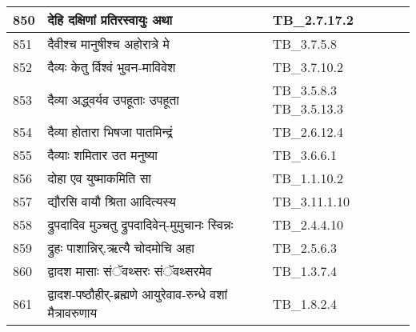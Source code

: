 \documentclass[17pt]{extarticle}
\begin{document}
\begin{longtable}{||p{0.4in}||p{4.9in}||p{0.9in}||}
    \hline
        
    850 & देहि दक्षिणां प्रतिरस्वायुः अथा & TB\_2.7.17.2       \\
    
    \hline
        
    851 & दैवीश्च मानुषीश्च अहोरात्रे मे & TB\_3.7.5.8       \\
    
    \hline
        
    852 & दैव्यः केतु र्विश्वं भुवन{-}माविवेश & TB\_3.7.10.2       \\
    
    \hline
        
    853 & दैव्या अद्ध्वर्यव उपहूताः उपहूता & TB\_3.5.8.3 TB\_3.5.13.3       \\
    
    \hline
        
    854 & दैव्या होतारा भिषजा पातमिन्द्रं & TB\_2.6.12.4       \\
    
    \hline
        
    855 & दैव्याः शमितार उत मनुष्या & TB\_3.6.6.1       \\
    
    \hline
        
    856 & दोहा एव युष्माकमिति सा & TB\_1.1.10.2       \\
    
    \hline
        
    857 & द्यौरसि वायौ श्रिता आदित्यस्य & TB\_3.11.1.10       \\
    
    \hline
        
    858 & द्रुपदादिव मुञ्चतु द्रुपदादिवेन्{-}मुमुचानः स्विन्नः & TB\_2.4.4.10       \\
    
    \hline
        
    859 & द्रुहः पाशान्निर्.ऋत्यै चोदमोचि अहा & TB\_2.5.6.3       \\
    
    \hline
        
    860 & द्वादश मासाः संॅवथ्सरः संॅवथ्सरमेव & TB\_1.3.7.4       \\
    
    \hline
        
    861 & द्वादश{-}पष्ठौहीर्{-}ब्रह्मणे आयुरेवाव{-}रुन्धे वशां मैत्रावरुणाय & TB\_1.8.2.4       \\
    
    \hline
        

\end{longtable}
\end{document}
